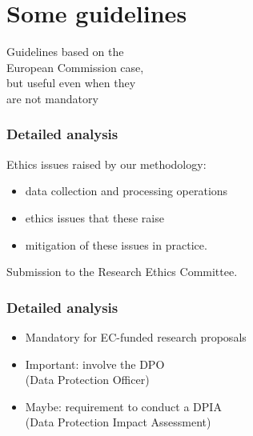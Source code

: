 \documentclass[17pt,aspectratio=169,hyperref={pdfusetitle,colorlinks,allcolors=olive}]{beamer}
\begin{document}
\section{Some guidelines}

\begin{frame}[fragile]

  {\Large Guidelines based on the \\
    European Commission case, \\
    but useful even when they \\
    are not mandatory \\
  }
\end{frame}

\begin{frame}[fragile]
  \frametitle{Detailed analysis}

  Ethics issues raised by our methodology:

  \begin{itemize}
  \item data collection and processing operations
  \item ethics issues that these raise
  \item mitigation of these issues in practice.
  \end{itemize}

  Submission to the Research Ethics Committee.
\end{frame}

\begin{frame}[fragile]
  \frametitle{Detailed analysis}

  \begin{itemize}
  \item Mandatory for EC-funded research proposals

  \item Important: involve the DPO \\
  (Data Protection Officer)

  \item Maybe: requirement to conduct a DPIA \\
    (Data Protection Impact Assessment)
  \end{itemize}
\end{frame}
\end{document}
